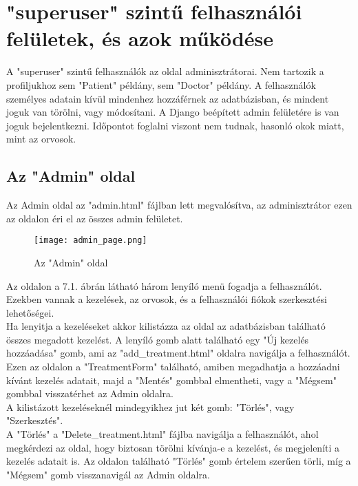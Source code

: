 \chapter{"superuser" szintű felhasználói felületek, és azok működése}
\label{chap:fejezet7}

A "superuser" szintű felhasználók az oldal adminisztrátorai. Nem tartozik a profiljukhoz sem "Patient" példány, sem "Doctor" példány. A felhasználók személyes adatain kívül mindenhez hozzáférnek az adatbázisban, és mindent joguk van törölni, vagy módosítani. A Django beépített admin felületére is van joguk bejelentkezni. Időpontot foglalni viszont nem tudnak, hasonló okok miatt, mint az orvosok.

\section{Az "Admin" oldal}

Az Admin oldal az "admin.html" fájlban lett megvalósítva, az adminisztrátor ezen az oldalon éri el az összes admin felületet.\\

\begin{figure}[!htbp]
	\caption{Az "Admin" oldal}
	\label{fig:adminpage}
	\centering
	\texttt{[image: admin\_page.png]}
\end{figure}

Az oldalon a 7.1. ábrán látható három lenyíló menü fogadja a felhasználót. Ezekben vannak a kezelések, az orvosok, és a felhasználói fiókok szerkesztési lehetőségei.\\

Ha lenyitja a kezeléseket akkor kilistázza az oldal az adatbázisban található összes megadott kezelést. A lenyíló gomb alatt található egy "Új kezelés hozzáadása" gomb, ami az "add\_treatment.html" oldalra navigálja a felhasználót. Ezen az oldalon a "TreatmentForm" található, amiben megadhatja a hozzáadni kívánt kezelés adatait, majd a "Mentés" gombbal elmentheti, vagy a "Mégsem" gombbal visszatérhet az Admin oldalra.\\

A kilistázott kezeléseknél mindegyikhez jut két gomb: "Törlés", vagy "Szerkesztés".\\

A "Törlés" a "Delete\_treatment.html" fájlba navigálja a felhasználót, ahol megkérdezi az oldal, hogy biztosan törölni kívánja-e a kezelést, és megjeleníti a kezelés adatait is. Az oldalon található "Törlés" gomb értelem szerűen törli, míg a "Mégsem" gomb visszanavigál az Admin oldalra.\\

